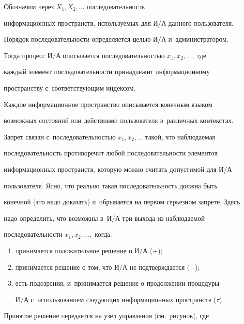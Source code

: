   Обозначим через $X_1, X_2, \ldots$ последовательность 


информационных пространств, используемых для И/А данного пользователя. 


Порядок последовательности определяется целью И\!/\!А и~администратором. 


Тогда процесс И\!/\!А описывается последовательностью $x_1, x_2,\ldots,$ где 


каждый элемент последовательности принадлежит информационному 


пространству с~соответствующим индексом.


  


  Каждое информационное пространство описывается конечным языком 


возможных состояний или действиями пользователя в~различных контекстах. 


Запрет связан с~последовательностью $x_1, x_2,\ldots$ такой, что наблюдаемая 


последовательность противоречит любой последовательности элементов 


информационных пространств, которую можно считать допустимой для И\!/\!А 


пользователя. Ясно, что реально такая последовательность должна быть 


конечной (это надо доказать) и~обрывается на первом серьезном запрете. Здесь 


надо определить, что возможны в~И\!/\!А три выхода из наблюдаемой 


последовательности $x_1, x_2,\ldots,$ когда: 


  \begin{enumerate}[(1)]


\item принимается положительное решение о И\!/\!А ($+$);


\item принимается решение о том, что И\!/\!А не подтверждается ($-$);


\item есть подозрения, и~принимается решение о продолжении процедуры 


И\!/\!А с~использованием следующих информационных пространств ($\tau$). 


  \end{enumerate}


  


  Принятое решение передается на узел управления (см.\ рисунок), где 


